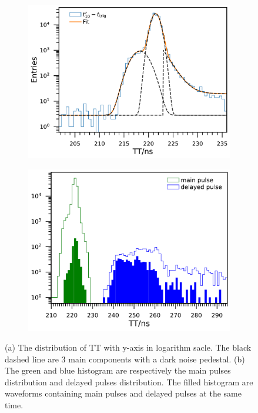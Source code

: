 \begin{figure}[!htbp]
    \centering
    \begin{subfigure}[t]{\SF\textwidth}
        \includegraphics[width=\textwidth]{figures/method/triggerTTSLog.pdf}
        \caption{}%
        \label{fig:triggerTTSLog}
    \end{subfigure}
    \begin{subfigure}[t]{\SF\textwidth}
        \includegraphics[width=\textwidth]{figures/method/triggerDelayedPulse.pdf}
        \caption{}%
        \label{fig:triggerTTlatepulse}
    \end{subfigure}
    \caption{(a) The distribution of TT with y-axis in logarithm sacle. The black dashed line are 3 main components with a dark noise pedestal. (b) The green and blue histogram are respectively the main pulses distribution and delayed pulses distribution. The filled histogram are waveforms containing main pulses and delayed pulses at the same time.}
\end{figure}

